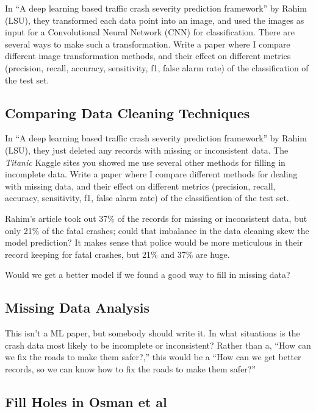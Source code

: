 \documentclass[11pt]{article}
\begin{document}
\begin{spacing}{1.2}
In ``A deep learning based traffic crash severity prediction framework'' by Rahim (LSU), they transformed each data point into an image, and used the images as input for a Convolutional Neural Network (CNN) for classification.  There are several ways to make such a transformation.  Write a paper where I compare different image transformation methods, and their effect on different metrics (precision, recall, accuracy, sensitivity, f1, false alarm rate) of the classification of the test set.  

\subsection{Comparing Data Cleaning Techniques}

In ``A deep learning based traffic crash severity prediction framework'' by Rahim (LSU), they just deleted any records with missing or inconsistent data.  The {\it Titanic} Kaggle sites you showed me use several other methods for filling in incomplete data.  Write a paper where I compare different methods for dealing with missing data, and their effect on different metrics (precision, recall, accuracy, sensitivity, f1, false alarm rate) of the classification of the test set.  

Rahim's article took out 37\% of the records for missing or inconsistent data, but only 21\% of the fatal crashes; could that imbalance in the data cleaning skew the model prediction?  It makes sense that police would be more meticulous in their record keeping for fatal crashes, but 21\% and 37\% are huge.  

Would we get a better model if we found a good way to fill in missing data?

\subsection{Missing Data Analysis}

This isn't a ML paper, but somebody should write it.  In what situations is the crash data most likely to be incomplete or inconsistent?  Rather than a, ``How can we fix the roads to make them safer?,'' this would be a ``How can we get better records, so we can know how to fix the roads to make them safer?''

\subsection{Fill Holes in Osman et al}


\end{spacing}
\end{document}
